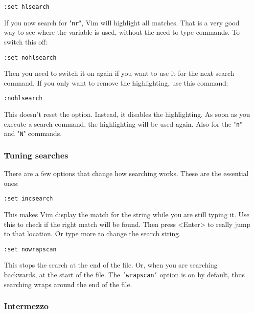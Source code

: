 \begin{Verbatim}[samepage=true]
 :set hlsearch
 \end{Verbatim}

If you now search for "\texttt{nr}", Vim will highlight all matches.
That is a very good way to see where the variable is used, without the need to type commands.
To switch this off:

 \begin{Verbatim}[samepage=true]
 :set nohlsearch
 \end{Verbatim}

Then you need to switch it on again if you want to use it for the next search
command.  If you only want to remove the highlighting, use this command:

 \begin{Verbatim}[samepage=true]
 :nohlsearch
 \end{Verbatim}

This doesn't reset the option.
Instead, it disables the highlighting.
As soon as you execute a search command, the highlighting will be used again.
Also for the "\texttt{n}" and "\texttt{N}" commands.

\subsubsection{Tuning searches}

There are a few options that change how searching works.  These are the
essential ones:

 \begin{Verbatim}[samepage=true]
 :set incsearch
 \end{Verbatim}

This makes Vim display the match for the string while you are still typing it.
Use this to check if the right match will be found.
Then press <Enter> to really jump to that location.
Or type more to change the search string.

 \begin{Verbatim}[samepage=true]
 :set nowrapscan
 \end{Verbatim}

This stops the search at the end of the file.
Or, when you are searching backwards, at the start of the file.
The \texttt{'wrapscan'} option is on by default, thus searching wraps around the end of the file.

\subsubsection{Intermezzo}


